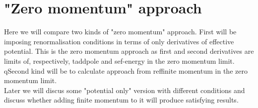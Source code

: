 \section{"Zero momentum" approach}
Here we will compare two kinds of "zero momentum" approach. 
First will be imposing renormalisation conditions in terms of only derivatives of 
effective potential. This is the zero momentum approach as first and second derivatives 
are limits of, respectively, taddpole and sef-energy in the zero momentum limit. \\
qSecond kind will be to calculate approach from ref{finite momentum} in the zero momentum limit.\\
Later we will discus some "potential only" version with different conditions and discuss whether 
adding finite momentum to it will produce satisfying results.  

